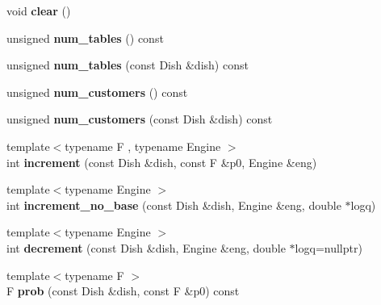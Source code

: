 \begin{DoxyCompactItemize}
\item 
\mbox{\label{classcpyp_1_1crp_a0d95743269151278b12bfb3c05448ec8}} 
void {\bfseries clear} ()
\item 
\mbox{\label{classcpyp_1_1crp_ab9759e064f5e2abdbcc415377678a3f9}} 
unsigned {\bfseries num\+\_\+tables} () const
\item 
\mbox{\label{classcpyp_1_1crp_ab73c50e1c8e8e27766e591fe6bee0cae}} 
unsigned {\bfseries num\+\_\+tables} (const Dish \&dish) const
\item 
\mbox{\label{classcpyp_1_1crp_a292da3acda9ee9e8518f24f2114742f9}} 
unsigned {\bfseries num\+\_\+customers} () const
\item 
\mbox{\label{classcpyp_1_1crp_a08d3ca70832bf03fa993a4b467599b7b}} 
unsigned {\bfseries num\+\_\+customers} (const Dish \&dish) const
\item 
\mbox{\label{classcpyp_1_1crp_a2b3b4e0f936bea5c7a285b4d60a6c56b}} 
{\footnotesize template$<$typename F , typename Engine $>$ }\\int {\bfseries increment} (const Dish \&dish, const F \&p0, Engine \&eng)
\item 
\mbox{\label{classcpyp_1_1crp_a6de21e19c2f95a46e03ffe92f27f585e}} 
{\footnotesize template$<$typename Engine $>$ }\\int {\bfseries increment\+\_\+no\+\_\+base} (const Dish \&dish, Engine \&eng, double $\ast$logq)
\item 
\mbox{\label{classcpyp_1_1crp_a9911e1fce989c85449a1b6b6bd8294df}} 
{\footnotesize template$<$typename Engine $>$ }\\int {\bfseries decrement} (const Dish \&dish, Engine \&eng, double $\ast$logq=nullptr)
\item 
\mbox{\label{classcpyp_1_1crp_a72d67f27c279c6ade9e1a4cf0ef77e68}} 
{\footnotesize template$<$typename F $>$ }\\F {\bfseries prob} (const Dish \&dish, const F \&p0) const
\item 
\mbox{\label{classcpyp_1_1crp_a0ae23ca0c3b5e0722f430f0cd25108f7}} 

\end{DoxyCompactItemize}
